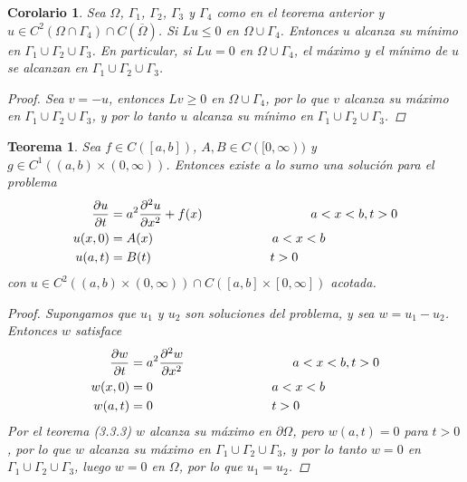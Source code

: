 \documentclass[11pt]{book}
\theoremstyle{plain}
\newtheorem{teo}[proposición]{Teorema}
\newtheorem{coro}[proposición]{Corolario}
\theoremstyle{definition}
\begin{document}
\begin{coro}
    Sea $\Omega$, $\Gamma_{1}$, $\Gamma_{2}$, $\Gamma_{3}$ y $\Gamma_{4}$ como en el teorema anterior y $u \in C^{2}(\Omega \cap \Gamma_{4})\cap C(\overline{\Omega})$. Si $Lu \leq 0$ en $\Omega\cup\Gamma_{4}$. Entonces $u$ alcanza su mínimo en $\Gamma_{1}\cup\Gamma_{2}\cup\Gamma_{3}$. En particular, si $Lu = 0$ en $\Omega\cup\Gamma_{4}$, el máximo y el mínimo de $u$ se alcanzan en $\Gamma_{1}\cup\Gamma_{2}\cup\Gamma_{3}$.
    \begin{proof}
        Sea $v = -u$, entonces $Lv \geq 0$ en $\Omega\cup\Gamma_{4}$, por lo que $v$ alcanza su máximo en $\Gamma_{1}\cup\Gamma_{2}\cup\Gamma_{3}$, y por lo tanto $u$ alcanza su mínimo en $\Gamma_{1}\cup\Gamma_{2}\cup\Gamma_{3}$.
    \end{proof}
\end{coro}

\begin{teo}
    Sea $f \in C([a,b])$, $A, B\in C([0,\infty))$ y $g\in C^{1}((a,b)\times(0,\infty))$. Entonces existe a lo sumo una solución para el problema
    \begin{align*}
        \frac{\partial u}{\partial t} &= a^{2} \frac{\partial^2 u}{\partial x^2} + f(x) \hspace{30mm} a<x<b, t > 0\\ 
        u(x,0)&= A(x) \hspace{33mm} a<x<b\\
        u(a,t)&= B(t) \hspace{33mm} t>0
    \end{align*}
    con $u \in C^{2}((a,b)\times(0,\infty))\cap C([a,b]\times[0,\infty])$ acotada.
    \begin{proof}
        Supongamos que $u_{1}$ y $u_{2}$ son soluciones del problema, y sea $w = u_{1} - u_{2}$. Entonces $w$ satisface
        \begin{align*}
            \frac{\partial w}{\partial t} &= a^{2} \frac{\partial^2 w}{\partial x^2} \hspace{30mm} a<x<b, t > 0\\ 
            w(x,0)&= 0 \hspace{33mm} a<x<b\\
            w(a,t)&= 0 \hspace{33mm} t>0
        \end{align*}
        Por el teorema (3.3.3) $w$ alcanza su máximo en $\partial \Omega$, pero $w(a,t) = 0$ para $t>0$, por lo que $w$ alcanza su máximo en $\Gamma_{1}\cup\Gamma_{2}\cup\Gamma_{3}$, y por lo tanto $w = 0$ en $\Gamma_{1}\cup\Gamma_{2}\cup\Gamma_{3}$, luego $w = 0$ en $\Omega$, por lo que $u_{1} = u_{2}$.
    \end{proof}
\end{teo}
\end{document}
